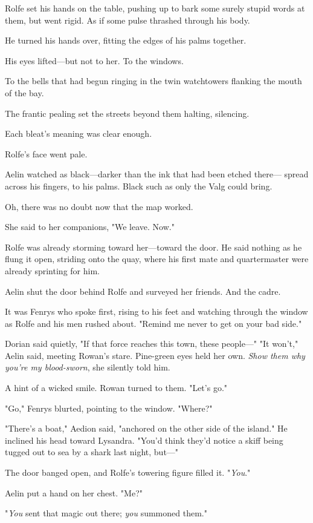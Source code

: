 Rolfe set his hands on the table, pushing up to bark some surely stupid words at them, but went rigid.
As if some pulse thrashed through his body.

He turned his hands over, fitting the edges of his palms together.

His eyes lifted---but not to her.
To the windows.

To the bells that had begun ringing in the twin watchtowers flanking the mouth of the bay.

The frantic pealing set the streets beyond them halting, silencing.

Each bleat's meaning was clear enough.

Rolfe's face went pale.

Aelin watched as black---darker than the ink that had been etched there--- spread across his fingers, to his palms.
Black such as only the Valg could bring.

Oh, there was no doubt now that the map worked.

She said to her companions, "We leave.
Now."

Rolfe was already storming toward her---toward the door.
He said nothing as he flung it open, striding onto the quay, where his first mate and quartermaster were already sprinting for him.

Aelin shut the door behind Rolfe and surveyed her friends.
And the cadre.

It was Fenrys who spoke first, rising to his feet and watching through the window as Rolfe and his men rushed about.
"Remind me never to get on your bad side."

Dorian said quietly, "If that force reaches this town, these people---" "It won't," Aelin said, meeting Rowan's stare.
Pine-green eyes held her own.
\emph{Show them why you're my blood-sworn}, she silently told him.

A hint of a wicked smile.
Rowan turned to them.
"Let's go."

"Go," Fenrys blurted, pointing to the window.
"Where?"

"There's a boat," Aedion said, "anchored on the other side of the island."
He inclined his head toward Lysandra.
"You'd think they'd notice a skiff being tugged out to sea by a shark last night, but---"

The door banged open, and Rolfe's towering figure filled it.
"\emph{You}."

Aelin put a hand on her chest.
"Me?"

"\emph{You} sent that magic out there; \emph{you} summoned them."

